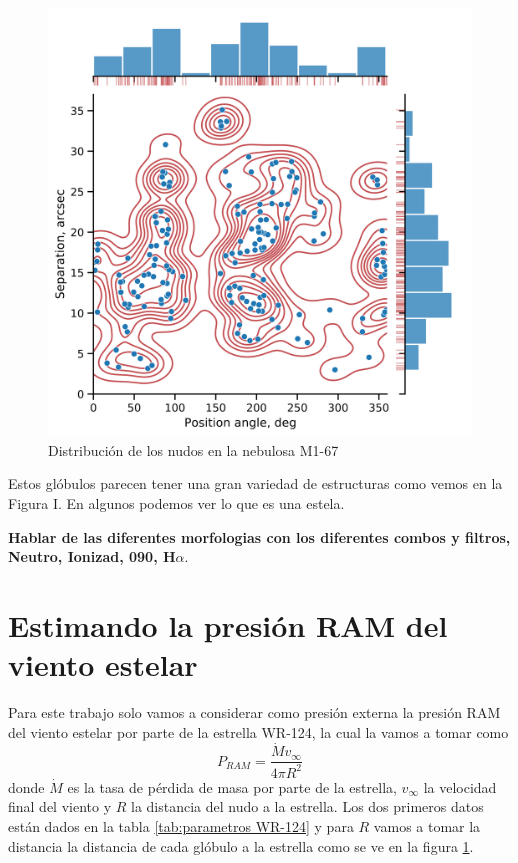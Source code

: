 \documentclass{book}
\begin{document}
\begin{figure}[htb]
    \centering    \includegraphics[width=\textwidth]{images Chapter 2/C2_nudos_distribucion.png}
    \caption{Distribución de los nudos en la nebulosa M1-67}
    \label{fig:dis_nudos}
\end{figure}

Estos glóbulos parecen tener una gran variedad de estructuras como vemos en la Figura I. En algunos podemos ver lo que es una estela.

\textbf{Hablar de las diferentes morfologias con los diferentes combos y filtros, Neutro, Ionizad, 090, H}$\alpha$.

\section{Estimando la presión RAM del viento estelar}

Para este trabajo solo vamos a considerar como presión externa la presión RAM del viento estelar por parte de la estrella WR-124, la cual la vamos a tomar como \[P_{RAM}= \frac{\dot{M}v_\infty}{4\pi R^2}\] donde $\dot{M}$ es la tasa de pérdida de masa por parte de la estrella, $v_\infty$ la velocidad final del viento y $R$ la distancia del nudo a la estrella. Los dos primeros datos están dados en la tabla \ref{tab:parametros WR-124} y para $R$ vamos a tomar la distancia la distancia de cada glóbulo a la estrella como se ve en la figura \ref{fig:dis_nudos}.
\end{document}
